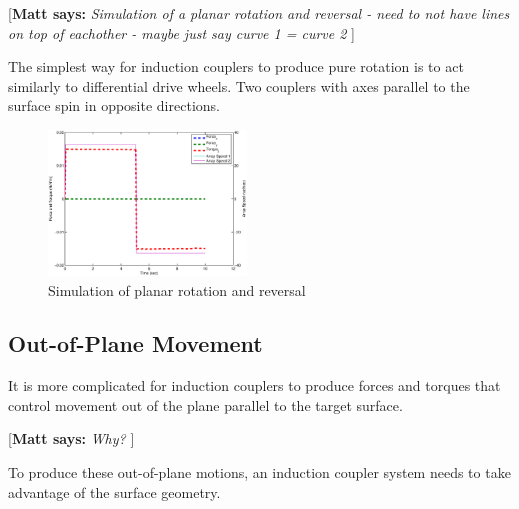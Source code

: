 \documentclass[letterpaper, 10 pt, conference]{ieeeconf}  %
\newcommand{\matt}[1]{{\color{darkgreen}\small\par {[{\bf Matt says:} {\em #1}} ] \\    }}
\begin{document}
\matt{Simulation of a planar rotation and reversal - need to not have lines on top of eachother - maybe just say curve 1 = curve 2}
      
The simplest way for induction couplers to produce pure rotation is to act similarly to differential drive wheels. Two couplers with axes parallel to the surface spin in opposite directions.

      \begin{figure}[thpb]
      \centering
      \includegraphics[width = 0.47\textwidth]{figures/planar_rotations.eps}
      \caption{Simulation of planar rotation and reversal}
      \label{fig:planarrotation}
   \end{figure}


\subsection{Out-of-Plane Movement}

It is more complicated for induction couplers to produce forces and torques that control movement out of the plane parallel to the target surface. \matt{Why?} To produce these out-of-plane motions, an induction coupler system needs to take advantage of the surface geometry.
 
\end{document}
